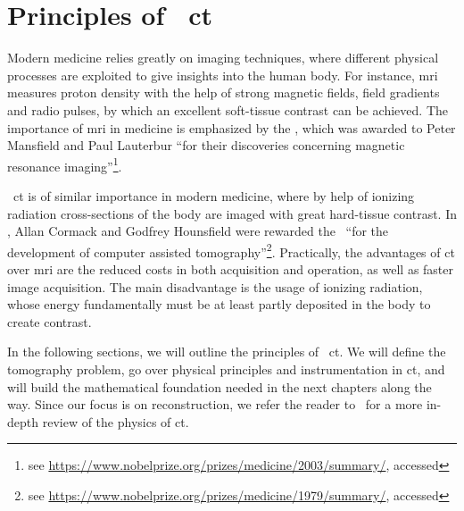 \documentclass[../ml-tct.tex]{subfiles}
\begin{document}
\chapter{Principles of \xray\ \texorpdfstring{\gls{ct}}{Computed Tomography}}%
\label{chap:principles}

\minitoc%
Modern medicine relies greatly on imaging techniques, where different physical processes are exploited to give insights into the human body.
For instance, \gls{mri} measures proton density with the help of strong magnetic fields, field gradients and radio pulses, by which an excellent soft-tissue contrast can be achieved.
The importance of \gls{mri} in medicine is emphasized by the  \nobelprice, which was awarded to Peter Mansfield and Paul Lauterbur \enquote{for their discoveries concerning magnetic resonance imaging}\footnote{see \url{https://www.nobelprize.org/prizes/medicine/2003/summary/}, accessed }.

\xray\ \gls{ct} is of similar importance in modern medicine, where by help of ionizing radiation cross-sections of the body are imaged with great hard-tissue contrast.
In , Allan Cormack and Godfrey Hounsfield were rewarded the \nobelprice\ \enquote{for the development of computer assisted tomography}\footnote{see \url{https://www.nobelprize.org/prizes/medicine/1979/summary/}, accessed }.
Practically, the advantages of \gls{ct} over \gls{mri} are the reduced costs in both acquisition and operation, as well as faster image acquisition.
The main disadvantage is the usage of ionizing radiation, whose energy fundamentally must be at least partly deposited in the body to create contrast.

In the following sections, we will outline the principles of \xray\ \gls{ct}.
We will define the tomography problem, go over physical principles and instrumentation in \gls{ct}, and will build the mathematical foundation needed in the next chapters along the way.
Since our focus is on reconstruction, we refer the reader to~\cite{buzug_computed_2008,prince_medical_2014} for a more in-depth review of the physics of \gls{ct}.
\end{document}
